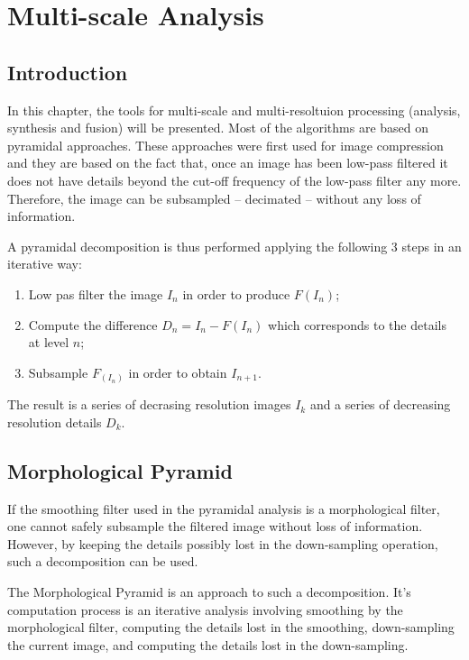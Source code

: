 \chapter{Multi-scale Analysis}
\section{Introduction}

In this chapter, the tools for multi-scale and multi-resoltuion
processing (analysis, synthesis and fusion) will be presented. Most of
the algorithms are based on pyramidal approaches. These approaches
were first used for image compression and they are based on the fact
that, once an image has been low-pass filtered it does not have
details beyond the cut-off frequency of the low-pass
filter any more. Therefore, the image can be subsampled -- decimated -- without
any loss of information.

A pyramidal decomposition is thus performed applying the following 3
steps in an iterative way:
\begin{enumerate}
  \item Low pas filter the image $I_{n}$ in order to produce $F(I_n)$;
  \item Compute the difference $D_n = I_n - F(I_n)$ which corresponds
  to the details at level $n$;
  \item Subsample $F_(I_n)$ in order to obtain $I_{n+1}$.
\end{enumerate}

The result is a series of decrasing resolution images $I_k$ and a
series of decreasing resolution details $D_k$.



\section{Morphological Pyramid}\label{secMorphoPyr}
If the smoothing filter used in the pyramidal analysis is a
morphological filter, one cannot safely subsample the filtered image
without loss of information. However, by keeping the details possibly
lost in the down-sampling operation, such a decomposition can be used.

The Morphological Pyramid is an approach to such a
decomposition. It's computation process is an iterative analysis
involving smoothing by the morphological filter, computing the
details lost in the smoothing, down-sampling the current image, and
computing the details lost in the down-sampling.

